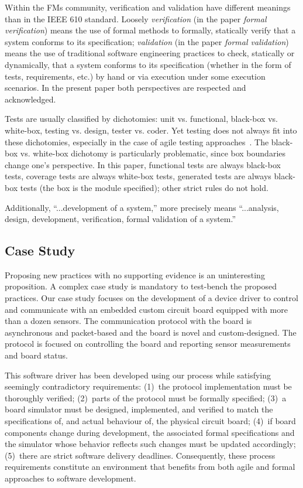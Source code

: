 \documentclass[english]{lni}
\begin{document}
Within the FMs community, verification and validation have different
meanings than in the IEEE 610 standard.  Loosely \emph{verification}
(in the paper \emph{formal verification}) means the use of formal
methods to formally, statically verify that a system conforms to its
specification; \emph{validation} (in the paper \emph{formal
  validation}) means the use of traditional software engineering
practices to check, statically or dynamically, that a system conforms
to its specification (whether in the form of tests, requirements,
etc.) by hand or via execution under some execution scenarios.  In the
present paper both perspectives are respected and acknowledged.

Tests are usually classified by dichotomies: unit vs. functional,
black-box vs. white-box, testing vs. design, tester vs. coder.  Yet
testing does not always fit into these dichotomies, especially in the
case of agile testing approaches~\cite{Beck2007}.  The black-box
vs. white-box dichotomy is particularly problematic, since box
boundaries change one's perspective.  In this paper, functional tests
are always black-box tests, coverage tests are always white-box tests,
generated tests are always black-box tests (the box is the module
specified); other strict rules do not hold.

Additionally, ``...development of a system,'' more precisely means
``...analysis, design, development, verification, formal validation of
a system.''

\subsection{Case Study}
\label{sec:case-study}

Proposing new practices with no supporting evidence is an
uninteresting proposition.  A complex case study is mandatory to
test-bench the proposed practices.  Our case study focuses on the
development of a device driver to control and communicate with an
embedded custom circuit board equipped with more than a dozen sensors.
The communication protocol with the board is asynchronous and
packet-based and the board is novel and custom-designed.  The protocol
is focused on controlling the board and reporting sensor measurements
and board status.

This software driver has been developed using our process while
satisfying seemingly contradictory requirements: (1)~the protocol
implementation must be thoroughly verified; (2)~parts of the protocol
must be formally specified; (3)~a board simulator must be designed,
implemented, and verified to match the specifications of, and actual
behaviour of, the physical circuit board; (4)~if board components
change during development, the associated formal specifications and
the simulator whose behavior reflects such changes must be updated
accordingly; (5)~there are strict software delivery deadlines.
Consequently, these process requirements constitute an environment
that benefits from both agile and formal approaches to software
development.
\end{document}
